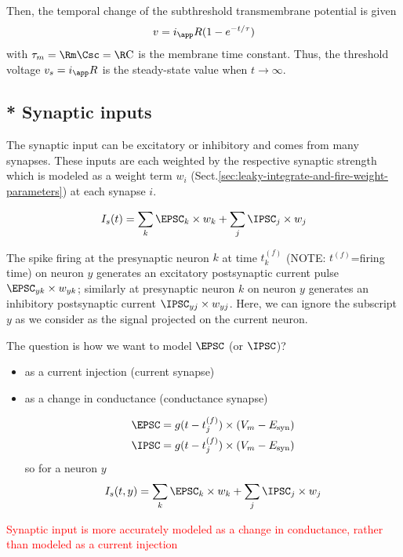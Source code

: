 Then, the temporal change of the
subthreshold transmembrane potential is given
\begin{eqnarray}
  \label{eq:494}
  v = i_\app R(1-e^{-t/\tau})
\end{eqnarray}
with $\tau_m=\Rm\Csc=\R\C$ is the membrane time constant.  Thus, the
threshold voltage $v_s=i_\app R$ is the steady-state value when
$t\rightarrow \infty$.

  

\subsection{ * Synaptic inputs}
\label{sec:synaptic-input}

The synaptic input can be excitatory or inhibitory and comes from many synapses.
These inputs are each weighted by the respective synaptic strength which is
modeled as a weight term $w_i$
(Sect.\ref{sec:leaky-integrate-and-fire-weight-parameters}) at each synapse $i$.

\begin{equation}
I_s(t) = \sum_k \EPSC_k \times w_k + \sum_j \IPSC_j \times w_j
\end{equation}

The spike firing at the presynaptic neuron $k$ at time $t^{(f)}_k$ (NOTE:
$t^{(f)}$=firing time) on neuron $y$ generates an excitatory 
postsynaptic current pulse $\EPSC_{yk} \times w_{yk}$; similarly at presynaptic
neuron $k$ on neuron $y$ generates an inhibitory postsynaptic current
$\IPSC_{yj} \times w_{yj}$. Here, we can ignore the subscript $y$ as we consider
as the signal projected on the current neuron.


The question is how we want to model $\EPSC$ (or $\IPSC$)?
\begin{itemize}
  \item as a current injection (current synapse)
  
  \item as a change in conductance (conductance synapse)
  
\begin{equation}
\begin{split}
\EPSC = g(t-t^{(f)}_j) \times (V_m - E_\syn) \\
\IPSC = g(t-t^{(f)}_j) \times (V_m - E_\syn)
\end{split}
\end{equation}  
so for a neuron $y$
\begin{equation}
I_s(t,y) = \sum_k \EPSC_k \times w_k + \sum_j \IPSC_j \times w_j
\end{equation}
\end{itemize}
\textcolor{red}{Synaptic input is more accurately modeled as a change in
conductance, rather than modeled as a current injection}

